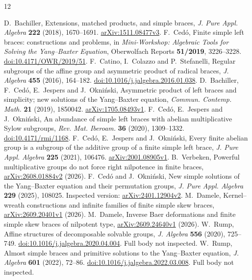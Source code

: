 \documentclass[11pt]{article}
\begin{document}
\begin{thebibliography}{12}\small\raggedright
{}
D.~Bachiller,
Extensions, matched products, and simple braces,
\emph{J. Pure Appl. Algebra} \textbf{222} (2018), 1670--1691.
\href{https://arxiv.org/abs/1511.08477v3}{arXiv:1511.08477v3}.
F.~Ced\'o,
Finite simple left braces: constructions and problems,
in \emph{Mini-Workshop: Algebraic Tools for Solving the Yang--Baxter Equation},
Oberwolfach Reports \textbf{51/2019}, 3226--3228.
\href{https://doi.org/10.4171/OWR/2019/51}{doi:10.4171/OWR/2019/51}.
F.~Catino, I.~Colazzo and P.~Stefanelli,
Regular subgroups of the affine group and asymmetric product of radical braces,
\emph{J. Algebra} \textbf{455} (2016), 164--182.
\href{https://doi.org/10.1016/j.jalgebra.2016.01.038}{doi:10.1016/j.jalgebra.2016.01.038}.
D.~Bachiller, F.~Ced\'o, E.~Jespers and J.~Okni\'nski,
Asymmetric product of left braces and simplicity; new solutions of the
Yang--Baxter equation,
\emph{Commun. Contemp. Math.} \textbf{21} (2019), 1850042.
\href{https://arxiv.org/abs/1705.08493v1}{arXiv:1705.08493v1}.
F.~Ced\'o, E.~Jespers and J.~Okni\'nski,
An abundance of simple left braces with abelian multiplicative Sylow subgroups,
\emph{Rev. Mat. Iberoam.} \textbf{36} (2020), 1309--1332.
\href{https://doi.org/10.4171/rmi/1168}{doi:10.4171/rmi/1168}.
F.~Ced\'o, E.~Jespers and J.~Okni\'nski,
Every finite abelian group is a subgroup of the additive group of a finite
simple left brace,
\emph{J. Pure Appl. Algebra} \textbf{225} (2021), 106476.
\href{https://arxiv.org/abs/2001.08905v1}{arXiv:2001.08905v1}.
B.~Verbeken,
Powerful multiplicative groups do not force right nilpotence in finite braces,
\href{https://arxiv.org/abs/2608.01884v2}{arXiv:2608.01884v2} (2026).
F.~Ced\'o and J.~Okni\'nski,
New simple solutions of the Yang--Baxter equation and their permutation groups,
\emph{J. Pure Appl. Algebra} \textbf{229} (2025), 108025.
Inspected version:
\href{https://arxiv.org/abs/2401.12904v2}{arXiv:2401.12904v2}.
M.~Damele,
Kernel--wreath constructions and infinite families of finite simple skew braces,
\href{https://arxiv.org/abs/2609.20401v1}{arXiv:2609.20401v1} (2026).
M.~Damele,
Inverse Baer deformations and finite simple skew braces of nilpotent type,
\href{https://arxiv.org/abs/2609.24640v1}{arXiv:2609.24640v1} (2026).
W.~Rump,
Affine structures of decomposable solvable groups,
\emph{J. Algebra} \textbf{556} (2020), 725--749.
\href{https://doi.org/10.1016/j.jalgebra.2020.04.004}{doi:10.1016/j.jalgebra.2020.04.004}.
Full body not inspected.
W.~Rump,
Almost simple braces and primitive solutions to the Yang--Baxter equation,
\emph{J. Algebra} \textbf{601} (2022), 72--86.
\href{https://doi.org/10.1016/j.jalgebra.2022.03.008}{doi:10.1016/j.jalgebra.2022.03.008}.
Full body not inspected.
\end{thebibliography}
\end{document}

